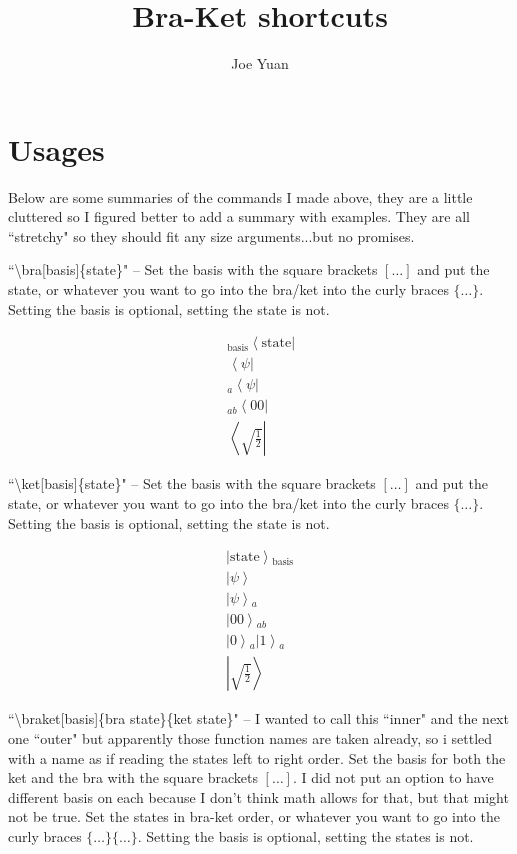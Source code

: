 \documentclass[12pt]{article}
\title{Bra-Ket shortcuts}
\author{Joe Yuan}
\date{}
\newcommand{\ket}[2][]{\left|#2\right\rangle\!{}_{#1}}
\newcommand{\bra}[2][]{\,{}_{#1}\!\left\langle#2\right|}
\begin{document}
\maketitle

\section*{Usages}

Below are some summaries of the commands I made above, they are a little cluttered so I figured better to add a summary with examples. They are all ``stretchy" so they should fit any size arguments...but no promises.
\newline

``\textbackslash bra[basis]\{state\}" -- Set the basis with the square brackets $[\dots]$ and put the state, or whatever you want to go into the bra/ket into the curly braces $\{\dots\}$.  Setting the basis is optional, setting the state is not.

\begin{align*}
\bra[\text{basis}]{\text{state}} \\
\bra{\psi} \\
\bra[a]{\psi} \\
\bra[ab]{00} \\
\bra{\sqrt{\frac{1}{2}}}
\end{align*}

``\textbackslash ket[basis]\{state\}" -- Set the basis with the square brackets $[\dots]$ and put the state, or whatever you want to go into the bra/ket into the curly braces $\{\dots\}$.  Setting the basis is optional, setting the state is not.

\begin{align*}
\ket[\text{basis}]{\text{state}} \\
\ket{\psi} \\
\ket[a]{\psi} \\
\ket[ab]{00} \\
\ket[a]{0}\ket[a]{1} \\
\ket{\sqrt{\frac{1}{2}}}
\end{align*}

\newpage

``\textbackslash braket[basis]\{bra state\}\{ket state\}" -- I wanted to call this ``inner" and the next one ``outer" but apparently those function names are taken already, so i settled with a name as if reading the states left to right order.  Set the basis for both the ket and the bra with the square brackets $[\dots]$. I did not put an option to have different basis on each because I don't think math allows for that, but that might not be true.  Set the states in bra-ket order, or whatever you want to go into the curly braces $\{\dots\}\{\dots\}$.  Setting the basis is optional, setting the states is not.
\end{document}
